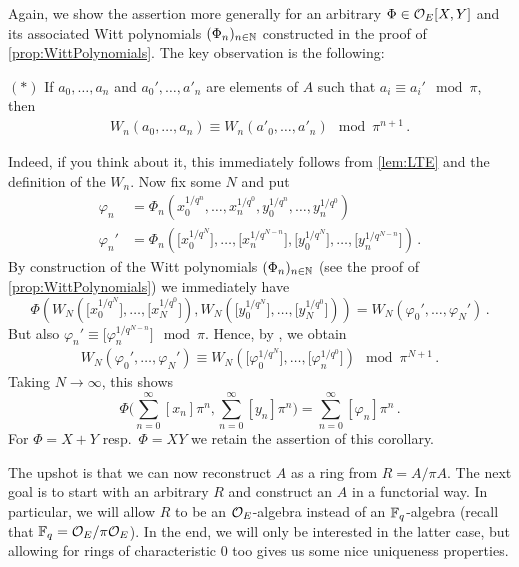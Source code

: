 \documentclass[a4paper, 10pt, oneside, DIV=9, chapterprefix=true, numbers=enddot,bibliography=totoc]{scrbook}
\begin{document}
\begin{proof*}
	Again, we show the assertion more generally for an arbitrary $\Phi\in\mathcal{O}_E[X,Y]$ and its associated Witt polynomials $(\Phi_n)_{n\in\mathbb{N}}$ constructed in the proof of \cref{prop:WittPolynomials}. The key observation is the following:
	\begin{numerate}
		\item[$(*)$] If $a_0,\dotsc,a_n$ and $a_0',\dotsc,a'_n$ are elements of $A$ such that $a_i\equiv a_i'\mod \pi$, then
		\begin{align*}
			W_n(a_0,\dotsc,a_n)\equiv W_n(a'_0,\dotsc,a'_n)\mod \pi^{n+1}\,.
		\end{align*}
	\end{numerate}
	Indeed, if you think about it, this immediately follows from \cref{lem:LTE} and the definition of the $W_n$. Now fix some $N$ and put
	\begin{align*}
		\varphi_n&=\Phi_n\left(x_0^{1/q^n},\dotsc,x_n^{1/q^0},y_0^{1/q^n},\dotsc,y_n^{1/q^0}\right)\\
		\varphi_n'&=\Phi_n\left(\big[x_0^{1/q^N}\big],\dotsc,\big[x_n^{1/q^{N-n}}\big],\big[y_0^{1/q^N}\big],\dotsc,\big[y_n^{1/q^{N-n}}\big]\right)\,.
	\end{align*}
	By construction of the Witt polynomials $(\Phi_n)_{n\in\mathbb{N}}$ (see the proof of \cref{prop:WittPolynomials}) we immediately have 
	\begin{equation*}
		\Phi\left(W_N\left(\big[x_0^{1/q^N}\big],\dotsc,\big[x_N^{1/q^0}\big]\right),W_N\left(\big[y_0^{1/q^N}\big],\dotsc,\big[y_N^{1/q^0}\big]\right)\right)= W_N(\varphi_0',\dotsc,\varphi_N')\,.
	\end{equation*}
	But also $\varphi_n'\equiv\big[\varphi_n^{1/q^{N-n}}\big]\mod \pi$. Hence, by \itememph{*}, we obtain
	\begin{align*}
		W_N(\varphi_0',\dotsc,\varphi_N')\equiv W_N\left(\big[\varphi_0^{1/q^N}\big],\dotsc,\big[\varphi_n^{1/q^{0}}\big]\right)\mod \pi^{N+1}\,.
	\end{align*}
	Taking $N\rightarrow\infty$, this shows
	\begin{equation*}
		\Phi\Bigg(\sum_{n=0}^\infty[x_n]\pi^n,\sum_{n=0}^\infty[y_n]\pi^n\Bigg)=\sum_{n=0}^\infty[\varphi_n]\pi^n\,.
	\end{equation*}
	For $\Phi=X+Y$ resp.\ $\Phi=XY$ we retain the assertion of this corollary.
\end{proof*}
The upshot is that we can now reconstruct $A$ as a ring from $R=A/\pi A$. The next goal is to start with an arbitrary $R$ and construct an $A$ in a functorial way. In particular, we will allow $R$ to be an $\mathcal{O}_E$-algebra instead of an $\mathbb{F}_q$-algebra (recall that $\mathbb{F}_q=\mathcal{O}_E/\pi\mathcal{O}_E$). In the end, we will only be interested in the latter case, but allowing for rings of characteristic $0$ too gives us some nice uniqueness properties.
\end{document}
